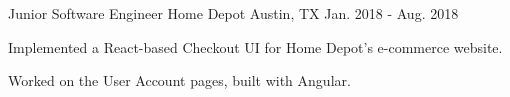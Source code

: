 

\begin{cventries}

    \cventry
    {Junior Software Engineer} %
    {Home Depot} %
    {Austin, TX} %
    {Jan. 2018 - Aug. 2018} %
    {
        \vspace{-4mm}
        \begin{cvitems} %
            \item {Implemented a React-based Checkout UI for Home Depot's e-commerce website.}
            \item {Worked on the User Account pages, built with Angular.}
        \end{cvitems}
    }


\end{cventries}
